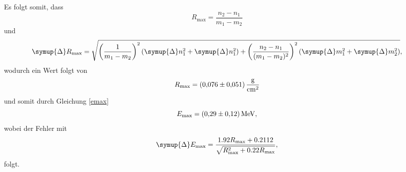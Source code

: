 Es folgt somit, dass
\begin{equation}
    R_\text{max} = \frac{n_2-n_1}{m_1-m_2}
\end{equation}
und
\begin{equation}
    \symup{\Delta}R_\text{max} = \sqrt{
        \left( \frac{1}{m_1-m_2} \right) ^2 (\symup{\Delta}n_1^2 + \symup{\Delta}n_1^2) +
        \left( \frac{n_2-n_1}{(m_1-m_2)^2}\right) ^2 \left(\symup{\Delta}m_1^2 + \symup{\Delta}m_2^2 \right)
        },
\end{equation}
wodurch ein Wert folgt von
\begin{equation}
    R_\text{max} = \SI{0.076\pm0.051}{\gram\per\centi\meter\squared}
\end{equation}
und somit durch Gleichung \eqref{emax}
\begin{equation}
    E_\text{max} = \SI{0.29\pm0.12}{\mega\electronvolt},
\end{equation}
wobei der Fehler mit
\begin{equation}
    \symup{\Delta}E_\text{max} = \frac{1.92 R_\text{max} + 0.2112}{\sqrt{R_\text{max}^2+0.22R_\text{max}}},
\end{equation}
folgt.
